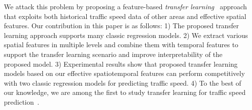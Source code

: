 We attack this problem by proposing a feature-based \textit{transfer learning}~\cite{Pan:Survey, wei2016transfer} approach that exploits both historical traffic speed data of other areas and effective spatial features.
Our contribution in this paper is as follows: 
1) The proposed transfer learning approach supports many classic regression models. 
2) We extract various spatial features in multiple levels and combine them with temporal features to support the transfer learning scenario and improve interpretability of the proposed model. 
3) Experimental results show that proposed transfer learning models based on our effective spatiotemporal features can perform competitively with two classic regression models for predicting traffic speed.
4) To the best of our knowledge, we are among the first to study transfer learning for traffic speed prediction~\cite{xu2016cross}.

